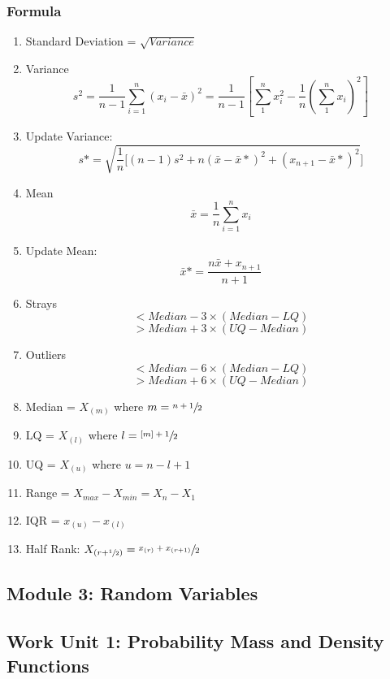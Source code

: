 \documentclass[a4paper,10pt]{article}
\begin{document}
\subsubsection{Formula}
\begin{enumerate}
	\item Standard Deviation  = $\sqrt{Variance}$
	\item Variance \[s^2 = \frac{1}{n-1}\sum_{i=1}^n(x_i-\bar{x})^2 = \frac{1}{n-1}[\sum_{1}^nx_i^2-\frac{1}{n}(\sum_1^nx_i)^2]\]
	\item Update Variance: \[ s* = \sqrt{\frac{1}{n}[(n-1)s^2+ n(\bar{x}-\bar{x}*)^2+(x_{n+1}-\bar{x}*)^2} ]\]
	\item Mean \[\bar{x} = \frac{1}{n}\sum_{i=1}^n x_i\]
	\item Update Mean: \[\bar{x}* = \frac{n\bar{x}+x_{n+1}}{n+1}\]
	\item Strays \[< Median -3\times (Median -LQ)\] \[ > Median +3\times (UQ-Median) \]
	\item Outliers \[< Median -6\times (Median -LQ)\] \[ > Median +6\times (UQ-Median) \]
	
	\item Median = $X_{(m)}$ where $m = \sfrac{n+1}{2}$
	\item LQ = $X_{(l)}$ where $l = \sfrac{[m]+1}{2}$
	\item UQ = $X_{(u)}$ where $u = n-l+1$
	\item Range = $X_{max}-X_{min} = X_{n}-X_{1}$
	\item IQR = $x_{(u)}-x_{(l)}$
	\item Half Rank: $X_{(r+\sfrac{1}{2})} = \sfrac{x_{(r)}+x_{(r+1)}}{2}$
\end{enumerate}


\subsection{Module 3: Random Variables}
\subsection{Work Unit 1: Probability Mass and Density Functions}
\end{document}
